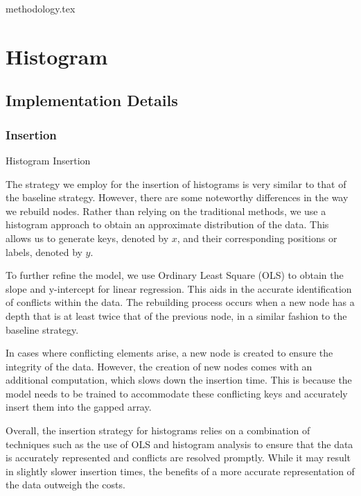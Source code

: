 \documentclass[11pt,a4paper]{article}
\begin{document}
{methodology.tex}



\section{Histogram}
\subsection{Implementation Details}
\subsubsection{Insertion}
\begin{algorithm}
\caption{Histogram Insertion}
\begin{algorithmic}[1]


\EndProcedure
\end{algorithmic}
\end{algorithm}




The strategy we employ for the insertion of histograms is very similar to that of the baseline strategy. However, there are some noteworthy differences in the way we rebuild nodes. Rather than relying on the traditional methods, we use a histogram approach to obtain an approximate distribution of the data. This allows us to generate keys, denoted by $x$, and their corresponding positions or labels, denoted by $y$.

To further refine the model, we use Ordinary Least Square (OLS) to obtain the slope and y-intercept for linear regression. This aids in the accurate identification of conflicts within the data. The rebuilding process occurs when a new node has a depth that is at least twice that of the previous node, in a similar fashion to the baseline strategy.

In cases where conflicting elements arise, a new node is created to ensure the integrity of the data. However, the creation of new nodes comes with an additional computation, which slows down the insertion time. This is because the model needs to be trained to accommodate these conflicting keys and accurately insert them into the gapped array.

Overall, the insertion strategy for histograms relies on a combination of techniques such as the use of OLS and histogram analysis to ensure that the data is accurately represented and conflicts are resolved promptly. While it may result in slightly slower insertion times, the benefits of a more accurate representation of the data outweigh the costs.
\end{document}
